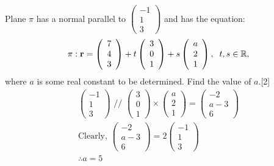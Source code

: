 \documentclass[12pt, a4 paper]{article}
\begin{document}
\begin{outline}[enumerate]
					\1 Plane $\pi $ has a normal parallel to $\left( {\begin{array}{*{20}{c}}{ - 1}\\1\\3\end{array}} \right)$ and has the equation:
					\begin{align*}
						\pi :{\bf{r}} = \left( {\begin{array}{*{20}{c}}7 \\4\\3\end{array}} \right) + t\left( {\begin{array}{*{20}{c}}3\\0\\1\end{array}} \right) + s\left( {\begin{array}{*{20}{c}}a\\2\\1\end{array}} \right),\;\;t,s \in \mathbb{R},
					\end{align*}
					where $a$ is some real constant to be determined.
					\2 Find the value of $a$.\hfill[2]
					\color{blue}
					\[\begin{array}{l}\left( {\begin{array}{*{20}{c}}{ - 1}\\1\\3\end{array}} \right){\textrm{ // }}\left( {\begin{array}{*{20}{c}}3\\0\\1\end{array}} \right) \times \left( {\begin{array}{*{20}{c}}a\\2\\1\end{array}} \right) = \left( {\begin{array}{*{20}{c}}{ - 2}\\{a - 3}\\6\end{array}} \right)\\{\textrm{Clearly, }}\left( {\begin{array}{*{20}{c}}{ - 2}\\{a - 3}\\6\end{array}} \right) = 2\left( {\begin{array}{*{20}{c}}{ - 1}\\1\\3\end{array}} \right)\\\therefore a = 5\end{array}\]

\end{outline}
\end{document}
